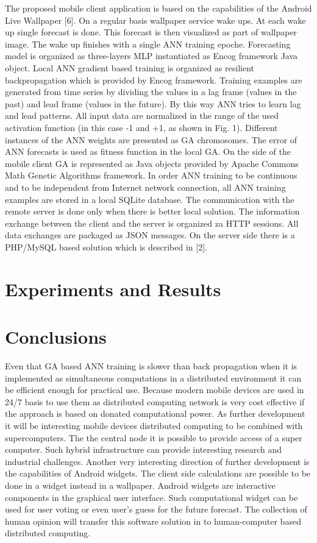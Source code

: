 \documentclass{llncs}
\begin{document}
The proposed mobile client application is based on the capabilities of the Android Live Wallpaper [6]. On a regular basis wallpaper service wake ups. At each wake up single forecast is done. This forecast is then visualized as part of wallpaper image. The wake up finishes with a single ANN training epoche. Forecasting model is organized as three-layers MLP instantiated as Encog framework Java object. Local ANN gradient based training is organized as resilient backpropagation which is provided by Encog framework. Training examples are generated from time series by dividing the values in a lag frame (values in the past) and lead frame (values in the future). By this way ANN tries to learn lag and lead patterns. All input data are normalized in the range of the used activation function (in this case -1 and +1, as shown in Fig. 1). Different instances of the ANN weights are presented as GA chromosomes. The error of ANN forecasts is used as fitness function in the local GA. On the side of the mobile client GA is represented as Java objects provided by Apache Commons Math Genetic Algorithms framework. In order ANN training to be continuous and to be independent from Internet network connection, all ANN training examples are stored in a local SQLite database. The communication with the remote server is done only when there is better local solution. The information exchange between the client and the server is organized za HTTP sessions. All data exchanges are packaged as JSON messages. On the server side there is a PHP/MySQL based solution which is described in [2]. 
%
\section{Experiments and Results}
%
%
\section{Conclusions}
%
Even that GA based ANN training is slower than back propagation when it is implemented as simultaneous computations in a distributed environment it can be efficient enough for practical use. Because modern mobile devices are used in 24/7 basis to use them as distributed computing network is very cost effective if the approach is based on donated computational power. As further development it will be interesting mobile devices distributed computing to be combined with supercomputers. The the central node it is possible to provide access of a super computer. Such hybrid infrastructure can provide interesting research and industrial challenges. Another very interesting direction of further development is the capabilities of Android widgets. The client side calculations are possible to be done in a widget instead in a wallpaper. Android widgets are interactive components in the graphical user interface. Such computational widget can be used for user voting or even user's guess for the future forecast. The collection of human opinion will transfer this software solution in to human-computer based distributed computing. 
%
\end{document}
